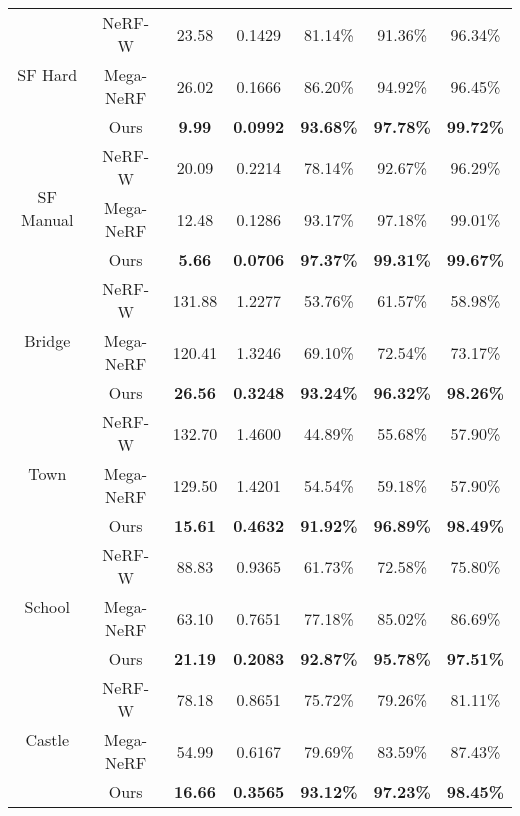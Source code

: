 \begin{table}[p]
{\begin{tabular}{ccccccc}
\multirow{3}{*}{SF Hard}   & NeRF-W    & 23.58          & 0.1429          & 81.14\%          & 91.36\%          & 96.34\%          \\
                           & Mega-NeRF & 26.02          & 0.1666          & 86.20\%          & 94.92\%          & 96.45\%          \\
                           & Ours      & \textbf{9.99}  & \textbf{0.0992} & \textbf{93.68\%} & \textbf{97.78\%} & \textbf{99.72\%} \\ \hline
\multirow{3}{*}{SF Manual} & NeRF-W    & 20.09          & 0.2214          & 78.14\%          & 92.67\%          & 96.29\%          \\
                           & Mega-NeRF & 12.48          & 0.1286          & 93.17\%          & 97.18\%          & 99.01\%          \\
                           & Ours      & \textbf{5.66}  & \textbf{0.0706} & \textbf{97.37\%} & \textbf{99.31\%} & \textbf{99.67\%} \\ \hline
\multirow{3}{*}{Bridge}    & NeRF-W    & 131.88         & 1.2277          & 53.76\%          & 61.57\%          & 58.98\%          \\
                           & Mega-NeRF & 120.41         & 1.3246          & 69.10\%          & 72.54\%          & 73.17\%          \\
                           & Ours      & \textbf{26.56} & \textbf{0.3248} & \textbf{93.24\%} & \textbf{96.32\%} & \textbf{98.26\%} \\ \hline
\multirow{3}{*}{Town}      & NeRF-W    & 132.70          & 1.4600           & 44.89\%          & 55.68\%          & 57.90\%          \\
                           & Mega-NeRF & 129.50          & 1.4201           & 54.54\%          & 59.18\%          & 57.90\%          \\
                           & Ours      & \textbf{15.61} & \textbf{0.4632} & \textbf{91.92\%} & \textbf{96.89\%} & \textbf{98.49\%} \\ \hline
\multirow{3}{*}{School}    & NeRF-W    & 88.83          & 0.9365          & 61.73\%          & 72.58\%          & 75.80\%          \\
                           & Mega-NeRF & 63.10           & 0.7651          & 77.18\%          & 85.02\%          & 86.69\%          \\
                           & Ours      & \textbf{21.19} & \textbf{0.2083} & \textbf{92.87\%} & \textbf{95.78\%} & \textbf{97.51\%} \\ \hline
\multirow{3}{*}{Castle}    & NeRF-W    & 78.18          & 0.8651          & 75.72\%          & 79.26\%          & 81.11\%          \\
                           & Mega-NeRF & 54.99          & 0.6167          & 79.69\%          & 83.59\%          & 87.43\%          \\
                           & Ours      & \textbf{16.66} & \textbf{0.3565} & \textbf{93.12\%} & \textbf{97.23\%} & \textbf{98.45\%} \\ \hline
\end{tabular}%
}
\end{table}